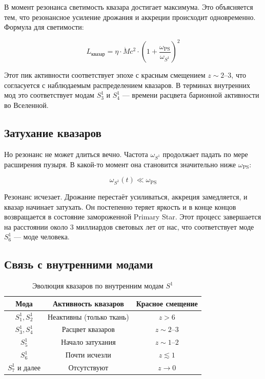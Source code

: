 \documentclass[12pt,a4paper]{article}
\begin{document}
В момент резонанса светимость квазара достигает максимума. Это объясняется тем, что резонансное усиление дрожания и аккреции происходит одновременно. Формула для светимости:

\[
L_{\text{квазар}} = \eta \cdot \dot{M} c^2 \cdot \left(1 + \frac{\omega_{\text{PS}}}{\omega_{S^1}}\right)^2
\]

Этот пик активности соответствует эпохе с красным смещением \(z \sim 2\)–\(3\), что согласуется с наблюдаемым распределением квазаров. В терминах внутренних мод это соответствует модам \(S^1_3\) и \(S^1_4\) — времени расцвета барионной активности во Вселенной.

\subsection{Затухание квазаров}

Но резонанс не может длиться вечно. Частота \(\omega_{S^1}\) продолжает падать по мере расширения пузыря. В какой-то момент она становится значительно ниже \(\omega_{\text{PS}}\):

\[
\omega_{S^1}(t) \ll \omega_{\text{PS}}
\]

Резонанс исчезает. Дрожание перестаёт усиливаться, аккреция замедляется, и квазар начинает затухать. Он постепенно теряет яркость и в конце концов возвращается в состояние замороженной Primary Star. Этот процесс завершается на расстоянии около 3 миллиардов световых лет от нас, что соответствует моде \(S^1_6\) — моде человека.

\subsection{Связь с внутренними модами}

\begin{table}[h]
\centering
\caption{Эволюция квазаров по внутренним модам \(S^1\)}
\begin{tabular}{c|c|c}
\toprule
\textbf{Мода} & \textbf{Активность квазаров} & \textbf{Красное смещение} \\
\midrule
\(S^1_1, S^1_2\) & Неактивны (только ткань) & \(z > 6\) \\
\(S^1_3, S^1_4\) & Расцвет квазаров & \(z \sim 2\)–\(3\) \\
\(S^1_5\) & Начало затухания & \(z \sim 1\)–\(2\) \\
\(S^1_6\) & Почти исчезли & \(z \lesssim 1\) \\
\(S^1_7\) и далее & Отсутствуют & \(z \to 0\) \\
\bottomrule
\end{tabular}
\end{table}
\end{document}
